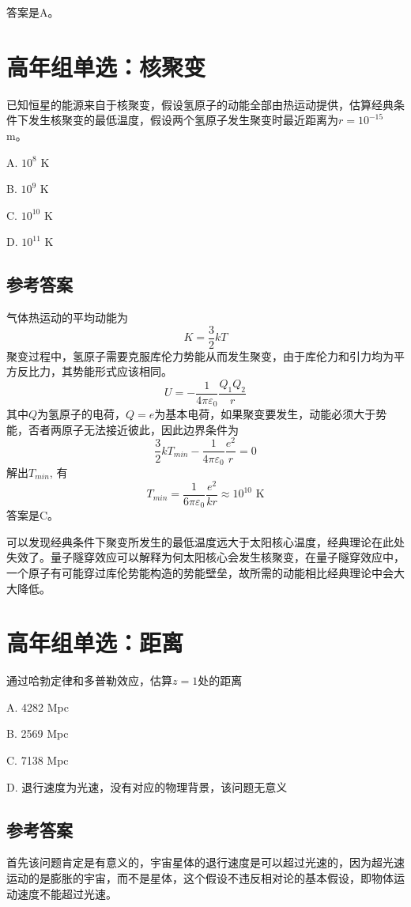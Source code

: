 \documentclass[UTF8]{ctexart}
\numberwithin{equation}{section}
\begin{document}
答案是A。

\newpage
\section{高年组单选：核聚变}
已知恒星的能源来自于核聚变，假设氢原子的动能全部由热运动提供，估算经典条件下发生核聚变的最低温度，假设两个氢原子发生聚变时最近距离为$r = 10^{-15}$ m。

A. $10^8$ K 

B. $10^9$ K 

C. $10^{10}$ K 

D. $10^{11}$ K 

\subsection{参考答案}
气体热运动的平均动能为
\[
K = \frac{3}{2}kT
\]
聚变过程中，氢原子需要克服库伦力势能从而发生聚变，由于库伦力和引力均为平方反比力，其势能形式应该相同。
\[
U = -\frac{1}{4\pi \varepsilon_0} \frac{Q_1 Q_2}{r}
\]
其中$Q$为氢原子的电荷，$Q=e$为基本电荷，如果聚变要发生，动能必须大于势能，否者两原子无法接近彼此，因此边界条件为
\[
\frac{3}{2}kT_{min} -\frac{1}{4\pi\varepsilon_0} \frac{e^2}{r} = 0
\]
解出$T_{min}$, 有
\[
T_{min} = \frac{1}{6\pi \varepsilon_0} \frac{e^2}{kr} \approx 10^{10} \text{ K}
\]
答案是C。

可以发现经典条件下聚变所发生的最低温度远大于太阳核心温度，经典理论在此处失效了。量子隧穿效应可以解释为何太阳核心会发生核聚变，在量子隧穿效应中，一个原子有可能穿过库伦势能构造的势能壁垒，故所需的动能相比经典理论中会大大降低。

\newpage
\section{高年组单选：距离}

通过哈勃定律和多普勒效应，估算$z = 1$处的距离

A. 4282 Mpc

B. 2569 Mpc

C. 7138 Mpc

D. 退行速度为光速，没有对应的物理背景，该问题无意义

\subsection{参考答案}
首先该问题肯定是有意义的，宇宙星体的退行速度是可以超过光速的，因为超光速运动的是膨胀的宇宙，而不是星体，这个假设不违反相对论的基本假设，即物体运动速度不能超过光速。
\end{document}
